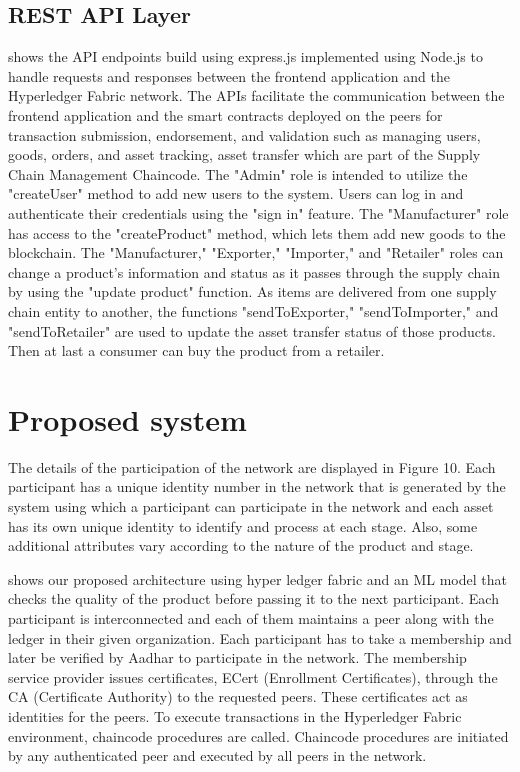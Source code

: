 \subsection{REST API Layer}
\noindent shows the API endpoints build using express.js implemented using Node.js to handle requests and responses between the frontend application and the Hyperledger Fabric network. The APIs facilitate the communication between the frontend application and the smart contracts deployed on the peers for transaction submission, endorsement, and validation such as managing users, goods, orders, and asset tracking, asset transfer which are part of the Supply Chain Management Chaincode.
The "Admin" role is intended to utilize the "createUser" method to add new users to the system. Users can log in and authenticate their credentials using the "sign in" feature.
The "Manufacturer" role has access to the "createProduct" method, which lets them add new goods to the blockchain. The "Manufacturer," "Exporter," "Importer," and "Retailer" roles can change a product's information and status as it passes through the supply chain by using the "update product" function.
As items are delivered from one supply chain entity to another, the functions "sendToExporter," "sendToImporter," and "sendToRetailer" are used to update the asset transfer status of those products.
Then at last a consumer can buy the product from a retailer.

\section{Proposed system}

\noindent The details of the participation of the network are displayed in Figure 10. Each participant has a unique identity number in the network that is generated by the system using which a participant can participate in the network and each asset has its own unique identity to identify and process at each stage. Also, some additional attributes vary according to the nature of the product and stage.


\noindent shows our proposed architecture using hyper ledger fabric and an ML model that checks the quality of the product before passing it to the next participant. Each participant is interconnected and each of them maintains a peer along with the ledger in their given organization. Each participant has to take a membership and later be verified by Aadhar to participate in the network. The membership service provider issues certificates, ECert (Enrollment Certificates), through the CA (Certificate Authority) to the requested peers. These certificates act as identities for the peers. To execute transactions in the Hyperledger Fabric environment, chaincode procedures are called. Chaincode procedures are initiated by any authenticated peer and executed by all peers in the network.

